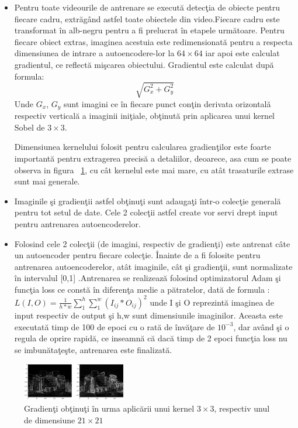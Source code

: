 \documentclass[a4paper,12pt]{report}
\begin{document}
\begin {itemize}
\item Pentru toate videourile de antrenare se execută detecţia de obiecte pentru fiecare cadru, extrăgând astfel toate obiectele din video.Fiecare cadru este transformat în alb-negru pentru a fi prelucrat în etapele următoare. Pentru fiecare obiect extras, imaginea acestuia este redimensionată pentru a respecta dimensiunea de intrare a autoencodere-lor la \( 64 \times 64 \) iar apoi este calculat gradientul, ce reflectă mişcarea obiectului. Gradientul este calculat după formula: \[\sqrt{G_{x}^2 + G_{y}^2}\] Unde \(G_{x}\), \(G_{y}\) sunt imagini ce în fiecare punct conţin derivata orizontală respectiv verticală a imaginii iniţiale, obţinută prin aplicarea unui kernel Sobel de \(3 \times 3 \).
\par Dimensiunea kernelului folosit pentru calcularea gradienţilor este foarte importantă pentru extragerea precisă a detaliilor, deoarece, asa cum se poate observa in figura ~\ref{fig:gradient_kernel}, cu cât kernelul este mai mare, cu atât trasaturile extrase sunt mai generale.
\item Imaginile şi gradienţii astfel obţinuţi sunt adaugaţi într-o colecţie generală pentru tot setul de date. Cele 2 colecţii astfel create vor servi drept input pentru antrenarea autoencoderelor.
\item Folosind cele 2 colecţii (de imagini, respectiv de gradienţi) este antrenat câte un autoencoder pentru fiecare colecţie. Înainte de a fi folosite pentru antrenarea autoencoderelor, atât imaginile, cât şi gradienţii, sunt normalizate în intervalul [0,1] .Antrenarea se realizează folosind optimizatorul Adam \cite{adam2017} şi funcţia loss ce constă în diferenţa medie a pătratelor, dată de formula : 
\(L(I,O) = \frac{1} {h*w} \sum_{1}^{h} \sum_{1}^{w} (I_{ij} * O_{ij})^2 \)   \cite{ionescu2019object} unde I şi O reprezintă imaginea de input respectiv de output şi h,w sunt dimensiunile imaginilor. Aceasta este executată timp de 100 de epoci cu o rată de învăţare de \(10^{-3}\), dar având şi o regula de oprire rapidă, ce inseamnă că dacă timp de 2 epoci funcţia loss nu se imbunătaţeşte, antrenarea este finalizată.
\end{itemize}

\begin{figure}
	  \begin{center}
        \includegraphics[width=0.4\textwidth]{images/gradients}
        \caption{Gradienţi obţinuţi în urma aplicării unui kernel \(3 \times 3 \), respectiv unul de dimensiune   \(21 \times 21 \)}
			\label{fig:gradient_kernel}
    \end{center}
\end{figure}
\end{document}
